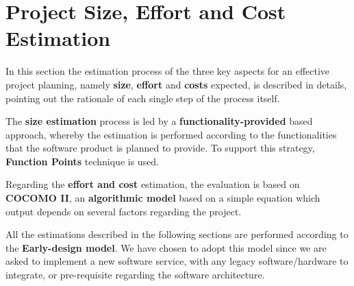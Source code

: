 \section{Project Size, Effort and Cost Estimation}

In this section the estimation process of the three key aspects for an effective project planning, namely \textbf{size}, \textbf{effort} and \textbf{costs} expected, is described in details, pointing out the rationale of each single step of the process itself.

The \textbf{size estimation} process is led by a \textbf{functionality-provided} based approach, whereby the estimation is performed according to the functionalities that the software product is planned to provide. To support this strategy, \textbf{Function Points} technique is used. 

Regarding the \textbf{effort and cost} estimation, the evaluation is based on \textbf{COCOMO II}, an \textbf{algorithmic model} based on a simple equation which output depends on several factors regarding the project.

All the estimations described in the following sections are performed according to the \textbf{Early-design model}. We have chosen to adopt this model since we are asked to implement a new software service, with any legacy software/hardware to integrate, or pre-requisite regarding the software architecture.

	
	
